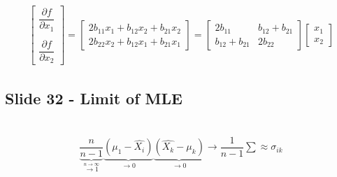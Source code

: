 \begin{equation*}
  \begin{gathered}
    \begin{bmatrix}\dfrac{\partial f}{\partial x_1}\\\\\dfrac{\partial f}{\partial x_2}\end{bmatrix} = \begin{bmatrix}2b_{11}x_1+b_{12}x_2+b_{21}x_2\\2b_{22}x_2+b_{12}x_1+b_{21}x_1\end{bmatrix} = \begin{bmatrix}2b_{11}& b_{12}+b_{21}\\b_{12}+b_{21}&2b_{22}\end{bmatrix}\begin{bmatrix}x_1\\x_2\end{bmatrix}
  \end{gathered}
\end{equation*}
\par\bigskip
\subsection{Slide 32 - Limit of MLE}\hfill\\
\begin{equation*}
  \begin{gathered}
    \underbrace{\dfrac{n}{n-1}}_{\stackrel{n\to\infty}{\to1}}\underbrace{(\mu_1-\hat{X_i})}_{\text{$\to0$}}\underbrace{(\hat{X_k}-\mu_k)}_{\text{$\to0$}}\to\dfrac{1}{n-1}\sum\approx \sigma_{ik}
  \end{gathered}
\end{equation*}
